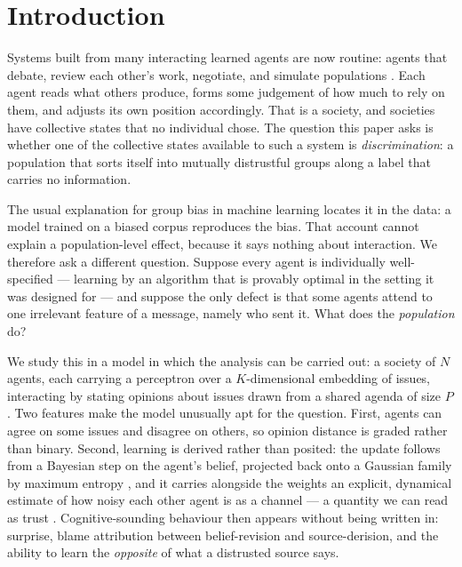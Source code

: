 \section{Introduction}
\label{sec:intro}

Systems built from many interacting learned agents are now routine: agents that
debate, review each other's work, negotiate, and simulate populations
\citep{park2023generative,du2023debate,chuang2024simulating}. Each agent reads
what others produce, forms some judgement of how much to rely on them, and adjusts
its own position accordingly. That is a society, and societies have collective
states that no individual chose. The question this paper asks is whether one of the
collective states available to such a system is \emph{discrimination}: a
population that sorts itself into mutually distrustful groups along a label that
carries no information.

The usual explanation for group bias in machine learning locates it in the data:
a model trained on a biased corpus reproduces the bias. That account cannot
explain a population-level effect, because it says nothing about interaction. We
therefore ask a different question. Suppose every agent is individually
well-specified --- learning by an algorithm that is provably optimal in the
setting it was designed for --- and suppose the only defect is that some agents
attend to one irrelevant feature of a message, namely who sent it. What does the
\emph{population} do?

We study this in a model in which the analysis can be carried out: a society of
$N$ agents, each carrying a perceptron over a $K$-dimensional embedding of
issues, interacting by stating opinions about issues drawn from a shared agenda
of size $P$. Two features make the model unusually apt for the question. First,
agents can agree on some issues and disagree on others, so opinion distance
is graded rather than binary. Second, learning is derived rather than posited:
the update follows from a Bayesian step on the agent's belief, projected back
onto a Gaussian family by maximum entropy
\citep{opper1996online,opper1998bayesian,caticha2020entropic}, and it carries
alongside the weights an explicit, dynamical estimate of how noisy each other
agent is as a channel --- a quantity we can read as trust
\citep{alves2016distrust,caticha2011agent}. Cognitive-sounding behaviour then
appears without being written in: surprise, blame attribution between
belief-revision and source-derision, and the ability to learn the \emph{opposite}
of what a distrusted source says.

